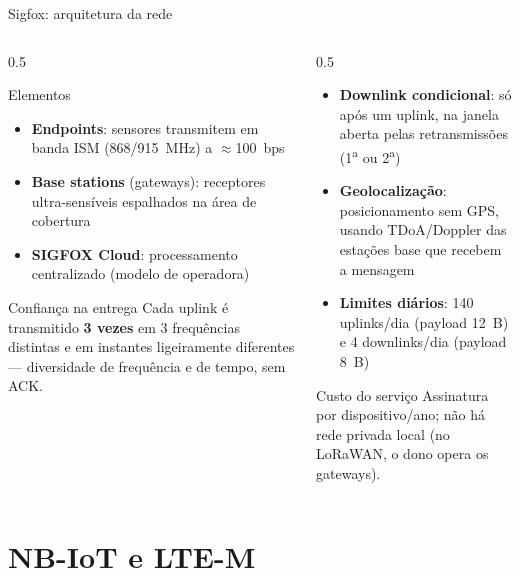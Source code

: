 \documentclass[aspectratio=169,11pt]{beamer}
\begin{document}
\begin{frame}{Sigfox: arquitetura da rede}
  \begin{columns}
    \begin{column}{0.5\textwidth}
      \begin{block}{Elementos}
        \begin{itemize}
          \item \textbf{Endpoints}: sensores transmitem em banda ISM (868/915~MHz) a $\approx$100~bps
          \item \textbf{Base stations} (gateways): receptores ultra-sensíveis espalhados na área de cobertura
          \item \textbf{SIGFOX Cloud}: processamento centralizado (modelo de operadora)
        \end{itemize}
      \end{block}
      \begin{block}{Confiança na entrega}
        Cada uplink é transmitido \textbf{3 vezes} em 3 frequências distintas e em instantes ligeiramente diferentes --- diversidade de frequência e de tempo, sem ACK.
      \end{block}
    \end{column}
    \begin{column}{0.5\textwidth}
      \begin{itemize}
        \item \textbf{Downlink condicional}: só após um uplink, na janela aberta pelas retransmissões (1\textsuperscript{a} ou 2\textsuperscript{a})
        \item \textbf{Geolocalização}: posicionamento sem GPS, usando TDoA/Doppler das estações base que recebem a mensagem
        \item \textbf{Limites diários}: 140 uplinks/dia (payload 12~B) e 4 downlinks/dia (payload 8~B)
      \end{itemize}
      \pause
      \begin{alertblock}{Custo do serviço}
        Assinatura por dispositivo/ano; não há rede privada local (no LoRaWAN, o dono opera os gateways).
      \end{alertblock}
    \end{column}
  \end{columns}
\end{frame}

\section{NB-IoT e LTE-M}
\end{document}
